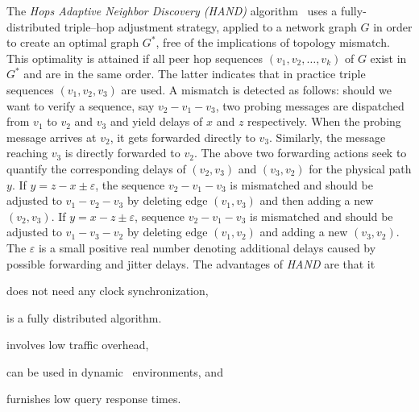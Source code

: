 The \emph{Hops Adaptive Neighbor Discovery (HAND)} algorithm~\cite{CLZHC2006}
uses a fully-distributed triple--hop adjustment strategy, applied to a network
graph $G$ in order to create an optimal graph $G^{*}$, free of the implications
of topology mismatch. This optimality is attained if all peer hop 
sequences $(v_1, v_2, \ldots, v_k)$ of $G$ exist in $G^{*}$ and are in the same
order. The latter indicates that in practice triple sequences $(v_1, v_2, v_3)$
are used. A mismatch is detected as follows: should we want to verify
a sequence, say $v_2-v_1-v_3$, two probing messages are dispatched from $v_1$ to
$v_2$ and $v_3$ and yield delays of $x$ and $z$ respectively.
%
When the probing message arrives at $v_2$, it gets forwarded
directly to $v_3$. 
Similarly, the message reaching $v_3$ is directly forwarded to $v_2$.
The above two forwarding actions seek to quantify 
the corresponding delays of $(v_2,v_3)$ and $(v_3,v_2)$
for the physical path $y$.
If $y=z-x\pm\varepsilon$, the sequence $v_2-v_1-v_3$ is mismatched and should
be adjusted to $v_1-v_2-v_3$ by deleting edge $(v_1,v_3)$ and 
then adding a new $(v_2,v_3)$. 
If $y=x-z\pm\varepsilon$, sequence $v_2-v_1-v_3$ is mismatched and
should be adjusted to $v_1-v_3-v_2$ by deleting edge $(v_1,v_2)$ and adding a
new $(v_3,v_2)$. 
The  $\varepsilon$ is a small positive real number denoting
additional delays caused by possible forwarding and jitter delays. 
The advantages of \emph{HAND} are that it
\begin{inparaenum}
  \item does not need any clock synchronization,
  \item is a fully distributed algorithm.
  \item involves low traffic overhead,
  \item can be used in dynamic \p\ environments, and 
  \item furnishes low query response times.
\end{inparaenum}
%
%
